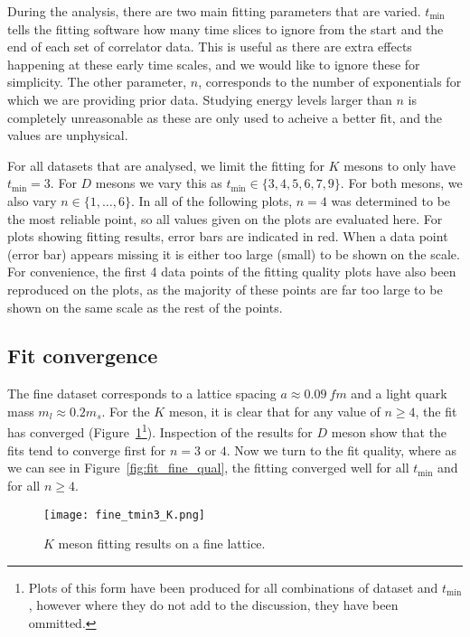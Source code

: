 \documentclass[a4paper,12pt]{article}
\begin{document}
During the analysis, there are two main fitting parameters that are varied. $t_\mathrm{min}$ tells the fitting software how many time slices to ignore from the start and the end of each set of correlator data. This is useful as there are extra effects happening at these early time scales, and we would like to ignore these for simplicity. The other parameter, $n$, corresponds to the number of exponentials for which we are providing prior data. Studying energy levels larger than $n$ is completely unreasonable as these are only used to acheive a better fit, and the values are unphysical.

For all datasets that are analysed, we limit the fitting for $K$ mesons to only have $t_\mathrm{min} = 3$. For $D$ mesons we vary this as $t_\mathrm{min} \in \{3, 4, 5, 6, 7, 9\}$. For both mesons, we also vary $n \in \{1, \ldots, 6\}$. In all of the following plots, $n=4$ was determined to be the most reliable point, so all values given on the plots are evaluated here. For plots showing fitting results, error bars are indicated in red. When a data point (error bar) appears missing it is either too large (small) to be shown on the scale. For convenience, the first 4 data points of the fitting quality plots have also been reproduced on the plots, as the majority of these points are far too large to be shown on the same scale as the rest of the points.

\subsection{Fit convergence}
The fine dataset corresponds to a lattice spacing $a \approx \SI{0.09}{fm}$ and a light quark mass $m_l \approx 0.2 m_s$. For the $K$ meson, it is clear that for any value of $n\geq4$, the fit has converged (Figure~\ref{fig:fit_fine_K}\footnote{Plots of this form have been produced for all combinations of dataset and $t_\mathrm{min}$, however where they do not add to the discussion, they have been ommitted.}). Inspection of the results for $D$ meson show that the fits tend to converge first for $n=3$ or $4$. Now we turn to the fit quality, where as we can see in Figure~\ref{fig:fit_fine_qual}, the fitting converged well for all $t_\mathrm{min}$ and for all $n \geq 4$.

\begin{figure}[p]
    \centering
    \texttt{[image: fine\_tmin3\_K.png]}
    \caption{$K$ meson fitting results on a fine lattice.\label{fig:fit_fine_K}}
\end{figure}
\end{document}
